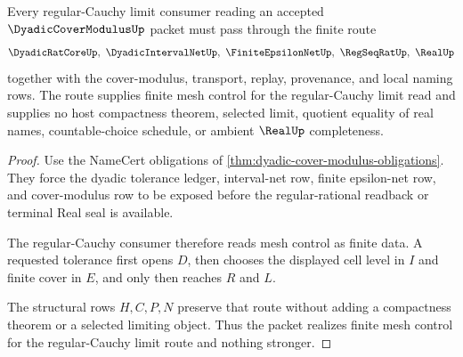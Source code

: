 \begin{theorem}
\label{thm:dyadic-cover-modulus-regular-cauchy-control}
Every regular-Cauchy limit consumer reading an accepted $\DyadicCoverModulusUp$ packet must pass through the finite route
$$
\DyadicRatCoreUp,\ \DyadicIntervalNetUp,\ \FiniteEpsilonNetUp,\ \RegSeqRatUp,\ \RealUp
$$
together with the cover-modulus, transport, replay, provenance, and local naming rows. The route supplies finite mesh control for the regular-Cauchy limit read and supplies no host compactness theorem, selected limit, quotient equality of real names, countable-choice schedule, or ambient $\RealUp$ completeness.
\end{theorem}
\begin{proof}
Use the NameCert obligations of \autoref{thm:dyadic-cover-modulus-obligations}. They force the dyadic tolerance ledger, interval-net row, finite epsilon-net row, and cover-modulus row to be exposed before the regular-rational readback or terminal Real seal is available.

The regular-Cauchy consumer therefore reads mesh control as finite data. A requested tolerance first opens $D$, then chooses the displayed cell level in $I$ and finite cover in $E$, and only then reaches $R$ and $L$.

The structural rows $H,C,P,N$ preserve that route without adding a compactness theorem or a selected limiting object. Thus the packet realizes finite mesh control for the regular-Cauchy limit route and nothing stronger.
\end{proof}





